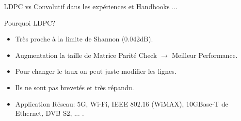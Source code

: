 \documentclass[8pt]{beamer}
\newcommand{\1}{\mathbbm 1}
\begin{document}
\begin{frame}{LDPC vs Convolutif dans les expériences et Handbooks ...}
%

\begin{block}{Pourquoi LDPC?}
\begin{itemize}
\item Très proche à la limite de Shannon (0.042dB).
\item Augmentation la taille de Matrice Parité Check $\rightarrow$ Meilleur Performance. 
\item Pour changer le taux on peut juste modifier les lignes.
\item Ils ne sont pas brevetés et très répandu.
\item Application Réseau: 5G, Wi-Fi, IEEE 802.16 (WiMAX), 10GBase-T de Ethernet, DVB-S2, ... .

\end{itemize}
\end{block}

\end{frame}
\end{document}
